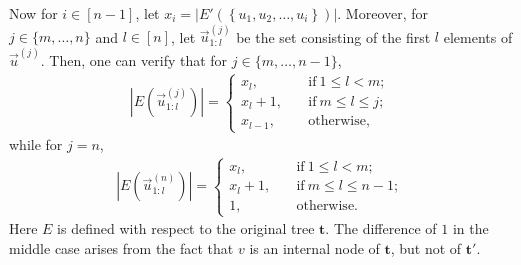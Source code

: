 \documentclass[superscriptaddress,onecolumn,nofootinbib,longbibliography,a4paper,accepted=2026-09-29]{quantumarticle}
\theoremstyle{plain}
\theoremstyle{definition}
\numberwithin{thm}{section}
\numberwithin{assumption}{section}
\numberwithin{lemma}{section}
\numberwithin{prop}{section}
\numberwithin{cor}{section}
\numberwithin{definition}{section}
\numberwithin{rmk}{section}
\numberwithin{equation}{section}
\newcommand{\lrcb}[1]{\left \{ #1 \right \}}
\newcommand{\mbt}{\mathbf{t}}
\begin{document}
Now for $i \in [n-1]$, let $x_i=|E'(\lrcb{u_1, u_2, \dots, u_i})|$.    
Moreover, for $j\in\{m, \dots, n\}$ and $l \in [n]$, let  
$\vec u^{(j)}_{1:l}$ be the set consisting of the first $l$ elements of $\vec u^{(j)}$.
Then, one can verify that for $j\in\{m,\dots, n-1\}$, 
\begin{align}
    |E(\vec u^{(j)}_{1:l})| = \begin{cases}
    x_l, \quad &\textrm{if}~1 \le l < m; \\
    x_l+1, \quad &\textrm{if}~m \le l \le j; \\
    x_{l-1}, \quad &\textrm{otherwise},        
    \end{cases}
\end{align}
while for $j=n$,
\begin{align}
    |E(\vec u^{(n)}_{1:l})| = \begin{cases}
    x_l, \quad &\textrm{if}~1 \le l < m; \\
    x_l+1, \quad &\textrm{if}~m \le l \le n-1; \\
    1, \quad &\textrm{otherwise}.       
    \end{cases}
\end{align}
Here $E$ is defined with respect to the original tree $\mbt$. The difference of $1$ in the middle case arises from the fact that $v$ is an internal node of $\mbt$, but not of $\mbt'$.
\end{document}
